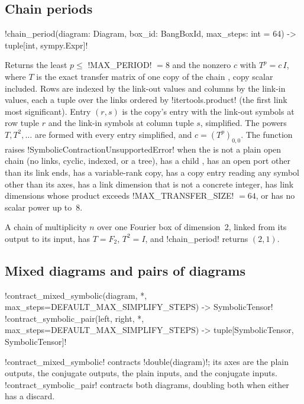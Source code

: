 \subsection{Chain periods}\label{sec:semantics-chain-period}

\begin{signature}
\py!chain_period(diagram: Diagram, box_id: BangBoxId, max_steps: int = 64) -> tuple[int, sympy.Expr]!
\end{signature}

\noindent Returns the least $p\le$ \py!MAX_PERIOD! $=8$ and the nonzero $c$ with $T^p=c\,I$, where $T$ is the exact transfer matrix of one copy of the chain \bbox{}, copy scalar included. Rows are indexed by the link-out values and columns by the link-in values, each a tuple over the links ordered by \py!itertools.product! (the first link most significant). Entry $(r,s)$ is the copy's entry with the link-out symbols at row tuple $r$ and the link-in symbols at column tuple $s$, simplified. The powers $T,T^2,\dots$ are formed with every entry simplified, and $c=(T^p)_{0,0}$. The function raises \py!SymbolicContractionUnsupportedError! when the \bbox{} is not a plain open chain (no links, cyclic, indexed, or a tree), has a child \bbox{}, has an open port other than its link ends, has a variable-rank copy, has a copy entry reading any symbol other than its axes, has a link dimension that is not a concrete integer, has link dimensions whose product exceeds \py!MAX_TRANSFER_SIZE! $=64$, or has no scalar power up to~8.

\begin{example}
A chain \bbox{} of multiplicity $n$ over one Fourier box of dimension~2, linked from its output to its input, has $T=F_2$, $T^2=I$, and \py!chain_period! returns $(2,1)$.
\end{example}

\subsection{Mixed diagrams and pairs of diagrams}

\begin{signature}
\py!contract_mixed_symbolic(diagram, *, max_steps=DEFAULT_MAX_SIMPLIFY_STEPS) -> SymbolicTensor!\\
\py!contract_symbolic_pair(left, right, *, max_steps=DEFAULT_MAX_SIMPLIFY_STEPS) -> tuple[SymbolicTensor, SymbolicTensor]!
\end{signature}
\noindent \py!contract_mixed_symbolic! contracts \py!double(diagram)!; its axes are the plain outputs, the conjugate outputs, the plain inputs, and the conjugate inputs. \py!contract_symbolic_pair! contracts both diagrams, doubling both when either has a discard.

